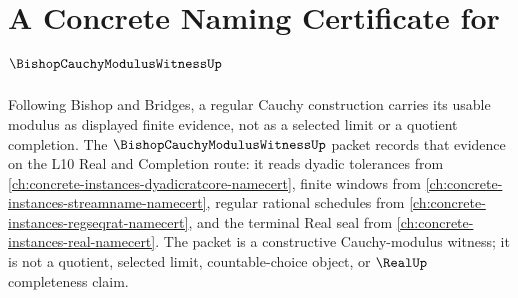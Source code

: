 \chapter{A Concrete Naming Certificate for $\BishopCauchyModulusWitnessUp$}
\label{ch:concrete-instances-bishop-cauchy-modulus-witness-namecert}

Following Bishop and Bridges, a regular Cauchy construction carries its usable modulus as displayed finite evidence, not as a selected limit or a quotient completion. The $\BishopCauchyModulusWitnessUp$ packet records that evidence on the L10 Real and Completion route: it reads dyadic tolerances from \autoref{ch:concrete-instances-dyadicratcore-namecert}, finite windows from \autoref{ch:concrete-instances-streamname-namecert}, regular rational schedules from \autoref{ch:concrete-instances-regseqrat-namecert}, and the terminal Real seal from \autoref{ch:concrete-instances-real-namecert}. The packet is a constructive Cauchy-modulus witness; it is not a quotient, selected limit, countable-choice object, or $\RealUp$ completeness claim.

